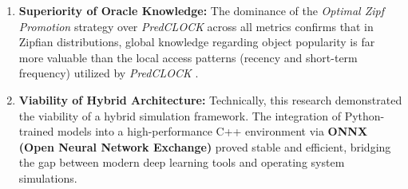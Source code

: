 \begin{enumerate}
  \item \textbf{Superiority of Oracle Knowledge:}
    The dominance of the \textit{Optimal Zipf Promotion} strategy
    over \textit{PredCLOCK} across all metrics confirms that in
    Zipfian distributions, global knowledge regarding object
    popularity is far more valuable than the local access patterns
    (recency and short-term frequency) utilized by \textit{PredCLOCK}
    .

  \item \textbf{Viability of Hybrid Architecture:}
    Technically, this research demonstrated the viability of a hybrid
    simulation framework. The integration of Python-trained models
    into a high-performance C++ environment via \textbf{ONNX (Open
    Neural Network Exchange)} proved stable and efficient, bridging
    the gap between modern deep learning tools and operating system
    simulations.
\end{enumerate}
